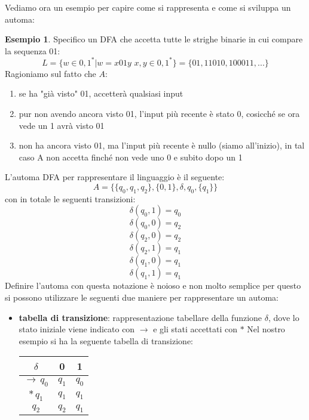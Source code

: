\documentclass[a4paper]{book}
\theoremstyle{definition}%
\newtheorem*{esempio}{Esempio}
\begin{document}
Vediamo ora un esempio per capire come si rappresenta e come si sviluppa un automa:
\begin{esempio}
Specifico un DFA che accetta tutte le strighe binarie in cui compare la sequenza 01:
\[ L=\{w \in {0,1}^* |w  = x01y \,\, x,y \in {0,1}^*\}=\{01,11010,100011,...\} \]
Ragioniamo sul fatto che $A$:
\begin{enumerate}
\item se ha "già visto" 01, accetterà qualsiasi input
\item pur non avendo ancora visto 01, l'input più recente è stato 0, cosicché se ora vede un 1 avrà visto 01
\item non ha ancora visto 01, ma l'input più recente è nullo (siamo all'inizio), in tal caso A non accetta finché non vede
uno 0 e subito dopo un 1
\end{enumerate}
L'automa DFA per rappresentare il linguaggio è il seguente:
\[ A=\{\{q_0,q_1,q_2\} ,\{0,1\}, \delta, q_0, \{q_1\} \} \]
con in totale le seguenti transizioni:
\[ \delta(q_0,1)=q_0 \]
\[ \delta(q_0,0)=q_2 \]
\[ \delta(q_2,0)=q_2 \]
\[ \delta(q_2,1)=q_1 \]
\[ \delta(q_1,0)=q_1 \]
\[ \delta(q_1,1)=q_1 \]
Definire l'automa con questa notazione è noioso e non molto semplice
per questo si possono utilizzare le seguenti due maniere per rappresentare un automa:
\begin{itemize}
  \item \textbf{tabella di transizione}: rappresentazione tabellare della funzione $\delta$,
        dove lo stato iniziale viene indicato con $\to$ e gli stati accettati con $*$
        Nel nostro esempio si ha la seguente tabella di transizione:
        \begin{table}
        \centering
        \begin{tabular}{c|c|c}
        $\delta$ & 0 & 1 \\
        \hline
        $\to\,q_0$ & $q_1$ & $q_0$\\
        \hline
        $*\,q_1$ & $q_1$ & $q_1$\\
        \hline
        $q_2$ & $q_2$ & $q_1$
        \end{tabular}
        \end{table}


\end{itemize}
\end{esempio}
\end{document}
